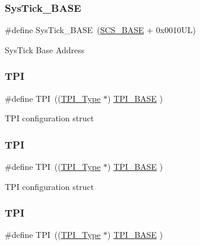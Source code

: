 \subsubsection{\texorpdfstring{SysTick\_BASE}{SysTick\_BASE}\hspace{0.1cm}{\footnotesize\ttfamily [12/12]}}
{\footnotesize\ttfamily \#define Sys\+Tick\+\_\+\+B\+A\+SE~(\mbox{\hyperlink{group___c_m_s_i_s__core__base_ga3c14ed93192c8d9143322bbf77ebf770}{S\+C\+S\+\_\+\+B\+A\+SE}} +  0x0010\+U\+L)}

Sys\+Tick Base Address \mbox{\label{group___c_m_s_i_s__core__base_ga8b4dd00016aed25a0ea54e9a9acd1239}} 
\subsubsection{\texorpdfstring{TPI}{TPI}\hspace{0.1cm}{\footnotesize\ttfamily [1/8]}}
{\footnotesize\ttfamily \#define T\+PI~((\mbox{\hyperlink{struct_t_p_i___type}{T\+P\+I\+\_\+\+Type}}       $\ast$)     \mbox{\hyperlink{group___c_m_s_i_s__core__base_ga2b1eeff850a7e418844ca847145a1a68}{T\+P\+I\+\_\+\+B\+A\+SE}}         )}

T\+PI configuration struct \mbox{\label{group___c_m_s_i_s__core__base_ga8b4dd00016aed25a0ea54e9a9acd1239}} 
\subsubsection{\texorpdfstring{TPI}{TPI}\hspace{0.1cm}{\footnotesize\ttfamily [2/8]}}
{\footnotesize\ttfamily \#define T\+PI~((\mbox{\hyperlink{struct_t_p_i___type}{T\+P\+I\+\_\+\+Type}}       $\ast$)     \mbox{\hyperlink{group___c_m_s_i_s__core__base_ga2b1eeff850a7e418844ca847145a1a68}{T\+P\+I\+\_\+\+B\+A\+SE}}         )}

T\+PI configuration struct \mbox{\label{group___c_m_s_i_s__core__base_ga8b4dd00016aed25a0ea54e9a9acd1239}} 
\subsubsection{\texorpdfstring{TPI}{TPI}\hspace{0.1cm}{\footnotesize\ttfamily [3/8]}}
{\footnotesize\ttfamily \#define T\+PI~((\mbox{\hyperlink{struct_t_p_i___type}{T\+P\+I\+\_\+\+Type}}       $\ast$)     \mbox{\hyperlink{group___c_m_s_i_s__core__base_ga2b1eeff850a7e418844ca847145a1a68}{T\+P\+I\+\_\+\+B\+A\+SE}}      )}

